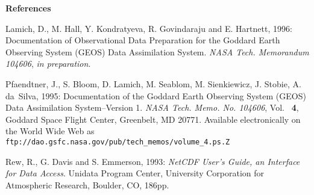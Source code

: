 %  
%  
%  
%
%
% 
\centerline{\huge\bf References}
% 
% 
\begin{description}
\item{}Lamich, D., M. Hall, Y. Kondratyeva, R. Govindaraju and E. Hartnett, 
       1996: Documentation of Observational Data Preparation for the Goddard 
       Earth Observing System (GEOS) Data Assimilation System. 
       {\em NASA Tech. Memorandum 104606}, {\em in preparation}.
 
\item{}Pfaendtner, J., S. Bloom, D. Lamich, M. Seablom, M. Sienkiewicz, 
       J. Stobie, A. da~Silva, 1995: 
       Documentation of the Goddard Earth Observing System (GEOS) Data 
       Assimilation System--Version 1.  
       {\em NASA Tech. Memo. No. 104606}, Vol. ~{\bf 4}, 
       Goddard Space Flight Center, Greenbelt, MD 20771. 
       Available electronically on the World Wide Web as
       {\tt ftp://dao.gsfc.nasa.gov/pub/tech\_memos/volume\_4.ps.Z}
 
\item{}Rew, R., G. Davis and S. Emmerson, 1993: 
       {\em NetCDF User's Guide, an Interface for Data Access}. 
       Unidata Program Center, University Corporation for Atmospheric 
       Research, Boulder, CO, 186pp.
\end{description}
 
